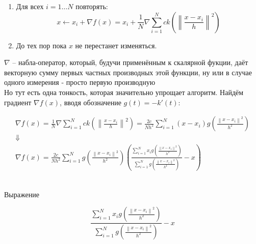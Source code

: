 \documentclass[11pt]{article}
\begin{document}
\begin{enumerate}
\item Для всех $i=1 \ldots N$ повторять:
$$
x \gets x_i + \nabla f(x) = x_i + \frac{1}{N}\nabla\sum\limits_{i = 1}^{N}ck\left(\left\|\frac{x - x_i}{h}\right\|^2\right)
$$
\item До тех пор пока $x$ не перестанет изменяться.
\end{enumerate}

$\nabla$ -- набла-оператор, который, будучи применённым к скалярной
фукции, даёт векторную сумму первых частных производных этой функции, ну
или в случае одного измерения - просто первую производную \\ Но тут есть одна тонкость, которая
значительно упрощает алгоритм. Найдём градиент $\nabla f(x)$, вводя
обозначение $g(t) = -k'(t)$:

\begin{gather*}
\nabla f(x) = \frac{1}{N}\nabla\sum\limits_{i = 1}^{N}ck\left(\left\|\frac{x - x_i}{h}\right\|^2\right) = \frac{2c}{Nh^2}\sum\limits_{i = 1}^{N}\left(x - x_i \right)g\left(\frac{\left\|x - x_i\right\|^2}{h^2}\right) \\
\Downarrow \\
\nabla f(x) = \frac{2c}{Nh^2}\sum\limits_{i = 1}^{N}g\left(\frac{\left\|x - x_i\right\|^2}{h^2}\right)\left(\frac{\sum\limits_{i = 1}^{N}x_i g\left(\frac{\left\|x - x_i\right\|^2}{h^2}\right)}{\sum\limits_{i = 1}^{N}g\left(\frac{\left\|x - x_i\right\|^2}{h^2}\right)} - x \right)
\end{gather*}

\\ Выражение

$$
\boxed{\frac{\sum\limits_{i = 1}^{N}x_i g\left(\frac{\left\|x - x_i\right\|^2}{h^2}\right)}{\sum\limits_{i = 1}^{N}g\left(\frac{\left\|x - x_i\right\|^2}{h^2}\right)} - x}
$$
\end{document}
